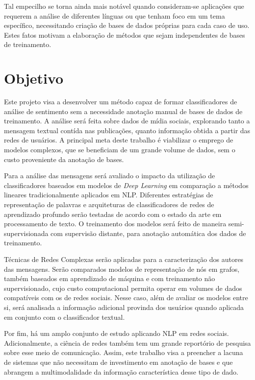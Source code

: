 Tal empecilho se torna ainda mais notável quando consideram-se aplicações que
requerem a análise de diferentes línguas ou que tenham foco em um tema
específico, necessitando criação de bases de dados próprias para cada caso de
uso.
Estes fatos motivam a elaboração de métodos que sejam independentes de bases de
treinamento.

\section{Objetivo}

Este projeto visa a desenvolver um método capaz de formar classificadores de
análise de sentimento sem a necessidade anotação manual de bases de dados de treinamento.
A análise será feita sobre dados de mídia sociais, explorando tanto a mensagem textual
contída nas publicações, quanto informação obtida a partir das redes de usuários.
A principal meta deste trabalho é viabilizar o emprego de modelos complexos,
que se beneficiam de um grande volume de dados, sem o custo proveniente da anotação
de bases.

Para a análise das mensagens será avaliado o impacto da utilização de
classificadores baseados em modelos de \textit{Deep Learning} em comparação a
métodos lineares tradicionalmente aplicados em NLP.
Diferentes estratégias de representação de palavras e arquiteturas de
classificadores de redes de aprendizado profundo serão testadas de acordo com o
estado da arte em processamento de texto.
O treinamento dos modelos será feito de maneira semi-supervisionada com supervisão distante,
para anotação automática dos dados de treinamento.

Técnicas de Redes Complexas serão aplicadas para a caracterização dos autores das
mensagens.
Serão comparados modelos de representação de nós em grafos, também baseados em
aprendizado de máquina e com treinamento não supervisionado, cujo custo
computacional permita operar em volumes de dados compatíveis com os de redes
sociais.
Nesse caso, além de avaliar os modelos entre si, será analisada a informação
adicional provinda dos usuários quando aplicada em conjunto com o classificador
textual.

Por fim, há um amplo conjunto de estudo aplicando NLP em redes sociais.
Adicionalmente, a ciência de redes também tem um grande reportório de pesquisa
sobre esse meio de comunicação.
Assim, este trabalho visa a preencher a lacuna de sistemas que não necessitam de
investimento em anotação de bases e que abrangem a multimodalidade da
informação característica desse tipo de dado.

